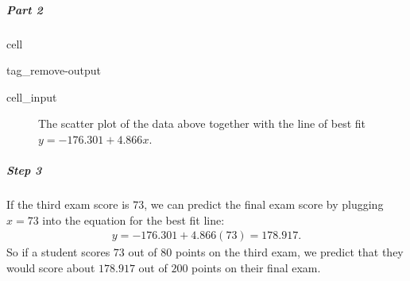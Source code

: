 \documentclass[letterpaper,10pt,english]{jupyterBook}
\begin{document}
\subparagraph{Part 2}
\label{\detokenize{Ch8 Correlation and Linear Regression/8.3 The Regression Equation:part-2}}
\begin{sphinxuseclass}{cell}
\begin{sphinxuseclass}{tag_remove-output}\begin{sphinxVerbatimInput}

\begin{sphinxuseclass}{cell_input}
\begin{sphinxVerbatim}[commandchars=\\\{\}]

\end{sphinxVerbatim}

\end{sphinxuseclass}\end{sphinxVerbatimInput}

\end{sphinxuseclass}
\end{sphinxuseclass}
\begin{figure}[htbp]
\centering
\capstart

\noindent{}
\caption{The scatter plot of the data above together with the line of best fit \(y = -176.301 + 4.866x\).}\label{\detokenize{Ch8 Correlation and Linear Regression/8.3 The Regression Equation:regline2}}\end{figure}


\subparagraph{Step 3}
\label{\detokenize{Ch8 Correlation and Linear Regression/8.3 The Regression Equation:step-3}}
\sphinxAtStartPar
If the third exam score is \(73\), we can predict the final exam score by plugging \(x = 73\) into the equation for the best fit line:
\begin{equation*}
\begin{split} y = -176.301 + 4.866(73) = 178.917. \end{split}
\end{equation*}
\sphinxAtStartPar
So if a student scores \(73\) out of \(80\) points on the third exam, we predict that they would score about \(178.917\) out of \(200\) points on their final exam.
\end{document}
